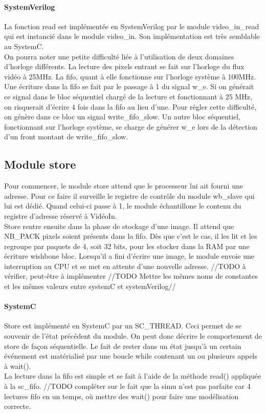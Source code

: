 \documentclass[a4paper,12pt]{report}
\begin{document}
{{\paragraph{SystemVerilog}
La fonction read est implémentée en SystemVerilog par le module video\_in\_read qui est instancié dans le module video\_in.
Son implémentation est très semblable au SystemC.\\
On pourra noter une petite difficulté liée à l'utilisation de deux domaines d'horloge différents.
La lecture des pixels entrant se fait sur l'horloge du flux vidéo à 25MHz.
La fifo, quant à elle fonctionne sur l'horloge système à 100MHz.
Une écriture dans la fifo se fait par le passage à 1 du signal w\_e.
Si on générait ce signal dans le bloc séquentiel chargé de la lecture et fonctionnant à 25 MHz,
on risquerait d'écrire 4 fois dans la fifo au lieu d'une.
Pour régler cette difficulté, on génère dans ce bloc un signal write\_fifo\_slow.
Un autre bloc séquentiel, fonctionnant sur l'horloge système, se charge de générer w\_e lors de la
détection d'un front montant de write\_fifo\_slow.


\subsection{Module store}
Pour commencer, le module store attend que le processeur lui ait fourni une adresse. Pour ce faire il surveille le registre de contrôle du module wb\_slave
qui lui est dédié. Quand celui-ci passe à 1, le module échantillone le contenu du registre d'adresse réservé à VidéoIn. \\
Store rentre ensuite dans la phase de stockage d'une image.
Il attend que NB\_PACK pixels soient présents dans la fifo. Dès que c'est le cas, il les lit et les regroupe par paquets de 4, soit 32 bits,
pour les stocker dans la RAM par une écriture wishbone bloc.
Lorsqu'il a fini d'écrire une image, le module envoie une interruption au CPU et se met en attente d'une nouvelle adresse.
//TODO à vérifier, peut-être à implémenter
//TODO Mettre les mêmes noms de constantes et les mêmes valeurs entre systemC et systemVerilog//


\paragraph{SystemC}
Store est implémenté en SystemC par un SC\_THREAD.
Ceci permet de se souvenir de l'état précédent du module.
On peut donc décrire le comportement de store de façon séquentielle.
Le fait de rester dans un état jusqu'à un certain événement est matérialisé par une boucle while contenant un ou plusieurs appels à wait(). \\
La lecture dans la fifo est simple et se fait à l'aide de la méthode read() appliquée à la sc\_fifo.
//TODO compléter sur le fait que la simu n'est pas parfaite car 4 lectures fifo en un temps, où mettre des wait() pour faire une modélisation correcte.

}}
\end{document}
